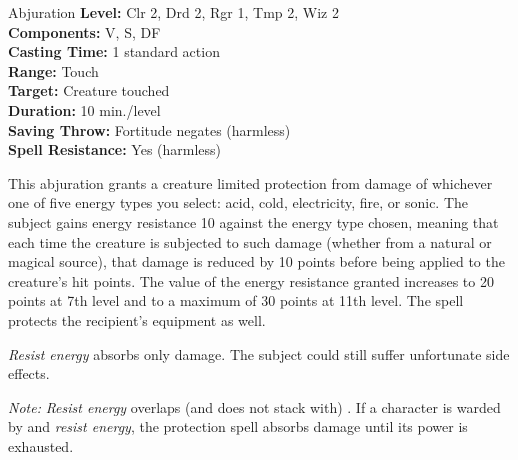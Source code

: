 {Abjuration}
{
	\textbf{Level:}
	Clr 2, Drd 2, Rgr 1, Tmp 2, Wiz 2\\
	\textbf{Components:}
	V, S, DF\\
	\textbf{Casting Time:}
	1 standard action\\
	\textbf{Range:}
	Touch\\
	\textbf{Target:}
	Creature touched\\
	\textbf{Duration:}
	10 min./level\\
	\textbf{Saving Throw:}
	Fortitude negates (harmless)\\
	\textbf{Spell Resistance:}
	Yes (harmless)\\
}
{
	This abjuration grants a creature limited protection from damage of whichever one of five energy types you select: acid, cold, electricity, fire, or sonic. The subject gains energy resistance 10 against the energy type chosen, meaning that each time the creature is subjected to such damage (whether from a natural or magical source), that damage is reduced by 10 points before being applied to the creature's hit points. The value of the energy resistance granted increases to 20 points at 7th level and to a maximum of 30 points at 11th level. The spell protects the recipient's equipment as well.

	\emph{Resist energy} absorbs only damage. The subject could still suffer unfortunate side effects.

	\textit{Note:} \emph{Resist energy} overlaps (and does not stack with) . If a character is warded by  and \emph{resist energy}, the protection spell absorbs damage until its power is exhausted.

}
